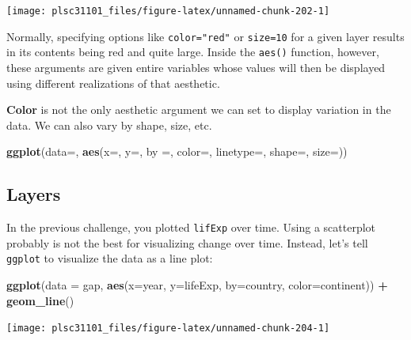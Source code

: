 \documentclass[
]{book}
\newenvironment{Shaded}{\begin{snugshade}}{\end{snugshade}}
\newcommand{\DataTypeTok}[1]{\textcolor[rgb]{0.13,0.29,0.53}{#1}}
\newcommand{\KeywordTok}[1]{\textcolor[rgb]{0.13,0.29,0.53}{\textbf{#1}}}
\newcommand{\NormalTok}[1]{#1}
\newcommand{\OperatorTok}[1]{\textcolor[rgb]{0.81,0.36,0.00}{\textbf{#1}}}
\newcommand{\StringTok}[1]{\textcolor[rgb]{0.31,0.60,0.02}{#1}}
\begin{document}
\begin{center}\texttt{[image: plsc31101\_files/figure-latex/unnamed-chunk-202-1]} \end{center}

Normally, specifying options like \texttt{color="red"} or \texttt{size=10} for a given layer results in its contents being red and quite large. Inside the \texttt{aes()} function, however, these arguments are given entire variables whose values will then be displayed using different realizations of that aesthetic.

\textbf{Color} is not the only aesthetic argument we can set to display variation in the data. We can also vary by shape, size, etc.

\begin{Shaded}
\begin{Highlighting}[]
\KeywordTok{ggplot}\NormalTok{(}\DataTypeTok{data=}\NormalTok{, }\KeywordTok{aes}\NormalTok{(}\DataTypeTok{x=}\NormalTok{, }\DataTypeTok{y=}\NormalTok{, }\DataTypeTok{by =}\NormalTok{, }\DataTypeTok{color=}\NormalTok{, }\DataTypeTok{linetype=}\NormalTok{, }\DataTypeTok{shape=}\NormalTok{, }\DataTypeTok{size=}\NormalTok{))}
\end{Highlighting}
\end{Shaded}

\hypertarget{layers}{%
\subsection{Layers}\label{layers}}

In the previous challenge, you plotted \texttt{lifExp} over time. Using a scatterplot probably is not the best for visualizing change over time. Instead, let's tell \texttt{ggplot} to visualize the data as a line plot:

\begin{Shaded}
\begin{Highlighting}[]
\KeywordTok{ggplot}\NormalTok{(}\DataTypeTok{data =}\NormalTok{ gap, }\KeywordTok{aes}\NormalTok{(}\DataTypeTok{x=}\NormalTok{year, }\DataTypeTok{y=}\NormalTok{lifeExp, }\DataTypeTok{by=}\NormalTok{country, }\DataTypeTok{color=}\NormalTok{continent)) }\OperatorTok{+}\StringTok{ }
\StringTok{  }\KeywordTok{geom_line}\NormalTok{()}
\end{Highlighting}
\end{Shaded}

\begin{center}\texttt{[image: plsc31101\_files/figure-latex/unnamed-chunk-204-1]} \end{center}
\end{document}
